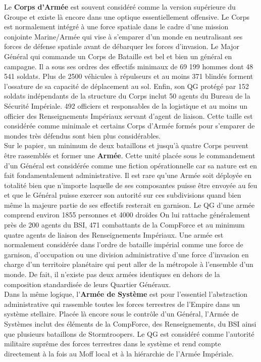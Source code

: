 \documentclass[twoside]{article}
\begin{document}
Le \textbf{Corps d'Armée} est souvent considéré comme la version supérieure du Groupe et existe là encore dans une optique essentiellement offensive. Le Corps est normalement intégré à une force spatiale dans le cadre d'une mission conjointe Marine/Armée qui vise à s'emparer d'un monde en neutralisant ses forces de défense spatiale avant de débarquer les forces d'invasion. Le Major Général qui commande un Corps de Bataille est bel et bien un général en campagne. Il a sous ses ordres des effectifs minimaux de 69 199 hommes dont 48 541 soldats. Plus de 2500 véhicules à répulseurs et au moins 371 blindés forment l'ossature de sa capacité de déplacement au sol. Enfin, son QG protégé par 152 soldats indépendants de la structure du Corps inclut 50 agents du Bureau de la Sécurité Impériale. 492 officiers et responsables de la logistique et au moins un officier des Renseignements Impériaux servant d'agent de liaison. Cette taille est considérée comme minimale et certains Corps d'Armée formés pour s'emparer de mondes très défendus sont bien plus considérables.\\

Sur le papier, un minimum de deux bataillons et jusqu'à quatre Corps peuvent être rassemblés et former une \textbf{Armée}. Cette unité placée sous le commandement d'un Général est considérée comme une fiction opérationnelle car sa nature est en fait fondamentalement administrative. Il est rare qu'une Armée soit déployée en totalité bien que n'importe laquelle de ses composantes puisse être envoyée au feu et que le Général puisse exercer son autorité sur ces subdivisions quand bien même la majeure partie de ses effectifs resterait en garnison. Le QG d'une armée comprend environ 1855 personnes et 4000 droïdes On lui rattache généralement près de 200 agents du BSI, 471 combattants de la CompForce et au minimum quatre agents de liaison des Renseignements Impériaux. Une armée est normalement considérée dans l'ordre de bataille impérial comme une force de garnison, d'occupation ou une division administrative d'une force d'invasion en charge d'un territoire planétaire qui peut aller de la métropole à l'ensemble d'un monde. De fait, il n'existe pas deux armées identiques en dehors de la composition standardisée de leurs Quartier Généraux.\\

Dans la même logique, l'\textbf{Armée de Système} est pour l'essentiel l'abstraction administrative qui rassemble toutes les forces terrestres de l'Empire dans un système stellaire. Placée là encore sous le contrôle d'un Général, l'Armée de Systèmes inclut des éléments de la CompForce, des Renseignements, du BSI ainsi que plusieurs bataillons de Stormtroopers. Le QG est considéré comme l'autorité militaire suprême des forces terrestres dans le système et rend compte directement à la fois au Moff local et à la hiérarchie de l'Armée Impériale.\\
\end{document}
